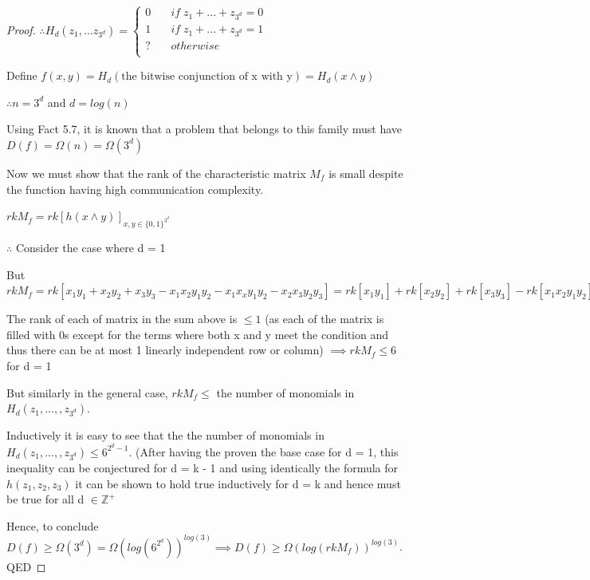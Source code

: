 \documentclass[usletter]{article}
\begin{document}
\begin{proof}
\noindent $\therefore H_d(z_1, ... z_{3^d}) = 
     \begin{cases}
       \text{0} &\quad{if\; z_1 + ... + z_{3^d} = 0} \\
       \text{1} &\quad{if\; z_1 + ... + z_{3^d} = 1} \\
       \text{?} &\quad{otherwise}\\
     \end{cases}
$ \newline 

\noindent Define $f (x, y) = H_d(\text{the bitwise conjunction of x with y}) = H_d(x \wedge y)$\newline

\noindent $\therefore n = 3^d$ and $d = log(n)$\newline

\noindent Using Fact 5.7, it is known that a problem that belongs to this family must have $D(f) = \Omega(n) = \Omega(3^d)$\newline

\noindent Now we must show that the rank of the characteristic matrix $M_f$ is small despite the function having high communication complexity. \newline

\noindent $rk M_f = rk[h(x \wedge y)]_{x, y \in {\{0, 1\}}^{3^d}}$ \newline

\noindent $\therefore$ Consider the case where d = 1 \newline

\noindent But $rk M_f = rk [x_1y_1 + x_2y_2 + x_3y_3 - x_1x_2y_1y_2 - x_1x_xy_1y_2 - x_2x_3y_2y_3] = rk [x_1y_1] + rk [x_2y_2] + rk[x_3y_3] - rk[x_1x_2y_1y_2] - rk[x_1x_xy_1y_2] - rk[x_2x_3y_2y_3]$\newline

\noindent The rank of each of matrix in the sum above is $\leq 1$ (as each of the matrix is filled with 0s except for the terms where both x and y meet the condition and thus there can be at most 1 linearly independent row or column) $\implies rk M_f \leq 6$ for d = 1\newline

\noindent But similarly in the general case, $rk M_f \leq$ the number of monomials in $H_d(z_1, ...,, z_{3^d})$. \newline

\noindent Inductively it is easy to see that the the number of monomials in $H_d(z_1, ...,, z_{3^d}) \leq 6^{2^{d} -1}$. (After having the proven the base case for d = 1, this inequality can be conjectured for d = k - 1 and using identically the formula for $h(z_1, z_2, z_3)$ it can be shown to hold true inductively for d = k and hence must be true for all d $\in \mathbb{Z}^+$ \newline

\noindent Hence, to conclude $D(f) \geq \Omega(3^d) = \Omega{(log(6^{2^d}))}^{log(3)} \implies D(f) \geq \Omega{(log(rkM_f))}^{log(3)}$. QED 

\end{proof}
\end{document}
